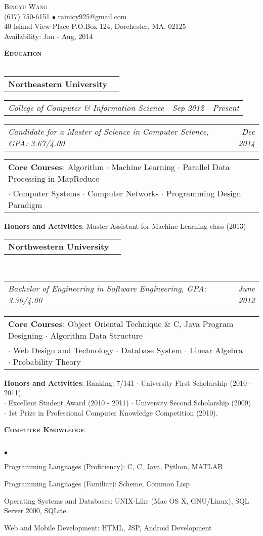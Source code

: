 \documentclass[11pt]{article}
\makeatletter
\newcommand{\lineunder}{\vspace*{-8pt} \\ \hspace*{-18pt} \hrulefill \\}
\newcommand{\header}[1]{{\hspace*{-15pt}\vspace*{6pt} \large \textsc{\textbf{#1}}} \vspace*{-6pt} \lineunder}
\newcommand{\contact}[4]{
\vspace*{-8pt}
\begin{center}
{\LARGE \scshape {#1}}\\
#2\\
#3 \\%
#4
\end{center}
\vspace*{-8pt}
}
\newenvironment{achievements}{\begin{list}{$\bullet$}{\topsep 0pt \itemsep -2pt}}{\vspace*{4pt}\end{list}}
\newcommand{\headerrow}[2]
{\begin{tabular*}{\linewidth}{l@{\extracolsep{\fill}}r}
	\hspace*{-15pt}#1 & #2 \\
\end{tabular*}}
\newcommand{\headerrowwf}[2]
{\begin{tabular*}{\linewidth}{l@{\extracolsep{\fill}}r}
	\hspace*{-15pt}#1 & #2 \\
\end{tabular*}}
\newcommand{\CPP}
 {C\nolinebreak[4]\hspace{-.05em}\raisebox{.22ex}{\footnotesize\bf ++}}
\makeatother
\begin{document}
\small
\smallskip
\vspace*{-55pt}

\contact{Bingyu Wang}
{(617) 750-6151 $\bullet$ rainicy925@gmail.com}
{40 Island View Place P.O.Box 124, Dorchester, MA, 02125}
{Availability: Jan - Aug, 2014}

\header{Education}
\headerrow
{\textbf{Northeastern University}}
{\text{Boston, MA}}
\headerrowwf
{\emph{College of Computer \& Information Science}}
{\emph{Sep 2012 - Present}}

\headerrowwf
{\emph{Candidate for a Master of Science in Computer Science, GPA: 3.67/4.00}}
{\emph{Dec 2014}}

\headerrowwf
{\textbf{Core Courses}:
Algorithm $\cdot$ Machine Learning  $\cdot$ Parallel Data Processing in MapReduce \\
\hspace*{54pt}$\cdot$ Computer Systems  $\cdot$ Computer Networks  $\cdot$   Programming Design Paradigm }
{\emph{}}

\hspace*{-8pt}\textbf{Honors and Activities}:
Master Assistant for Machine Learning class (2013)

\vspace*{2.5pt}

\headerrow
{\textbf{Northwestern University}}
{\text{Xi'an, China}}
\\
\headerrowwf
{\emph{Bachelor of Engineering in Software Engineering, GPA: 3.30/4.00}}
{\emph{June 2012}}

\headerrowwf
{\textbf{Core Courses}:
Object Oriental Technique \& \CPP, Java Program Designing  $\cdot$ Algorithm Data Structure \\
\hspace*{54pt}$\cdot$  Web Design and Technology  $\cdot$  Database System $\cdot$ Linear Algebra $\cdot$ Probability Theory}
{\emph{}}
\hspace*{-8pt}\textbf{Honors and Activities}: Ranking: 7/141 
$\cdot$ University First Scholarship (2010 - 2011)  \\
\hspace*{104pt}$\cdot$ Excellent Student Award (2010 - 2011)
$\cdot$ University Second Scholarship (2009)  \\
\hspace*{104pt}$\cdot$ 1st Prize in Professional Computer Knowledge Competition (2010).



\vspace*{2.5pt}
\header{Computer Knowledge}
\begin{achievements}
\item Programming Languages (Proficiency):  C, \CPP, Java, Python, MATLAB
\item Programming Languages (Familiar):  Scheme, Common Lisp
\item Operating Systems and Databases: UNIX-Like (Mac OS X, GNU/Linux), SQL Server 2000, SQLite
\item Web and Mobile Development: HTML, JSP, Android Development
\end{achievements}
\end{document}
